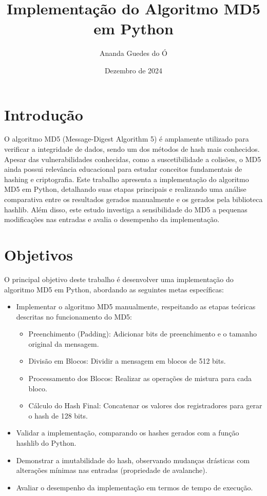 \documentclass{article}
\title{Implementação do Algoritmo MD5 em Python}
\author{Ananda Guedes do Ó}
\date{Dezembro de 2024}
\begin{document}
\maketitle

\section*{Introdução}

O algoritmo MD5 (Message-Digest Algorithm 5) é amplamente utilizado para verificar a integridade de dados, sendo um dos métodos de hash mais conhecidos. Apesar das vulnerabilidades conhecidas, como a suscetibilidade a colisões, o MD5 ainda possui relevância educacional para estudar conceitos fundamentais de hashing e criptografia. Este trabalho apresenta a implementação do algoritmo MD5 em Python, detalhando suas etapas principais e realizando uma análise comparativa entre os resultados gerados manualmente e os gerados pela biblioteca hashlib. Além disso, este estudo investiga a sensibilidade do MD5 a pequenas modificações nas entradas e avalia o desempenho da implementação.

\section*{Objetivos}

O principal objetivo deste trabalho é desenvolver uma implementação do algoritmo MD5 em Python, abordando as seguintes metas específicas:

\begin{itemize}
    \item Implementar o algoritmo MD5 manualmente, respeitando as etapas teóricas descritas no funcionamento do MD5:
    \begin{itemize}
        \item Preenchimento (Padding): Adicionar bits de preenchimento e o tamanho original da mensagem.
        \item Divisão em Blocos: Dividir a mensagem em blocos de 512 bits.
        \item Processamento dos Blocos: Realizar as operações de mistura para cada bloco.
        \item Cálculo do Hash Final: Concatenar os valores dos registradores para gerar o hash de 128 bits.
    \end{itemize}
    \item Validar a implementação, comparando os hashes gerados com a função hashlib do Python.
    \item Demonstrar a imutabilidade do hash, observando mudanças drásticas com alterações mínimas nas entradas (propriedade de avalanche).
    \item Avaliar o desempenho da implementação em termos de tempo de execução.
\end{itemize}
\end{document}
